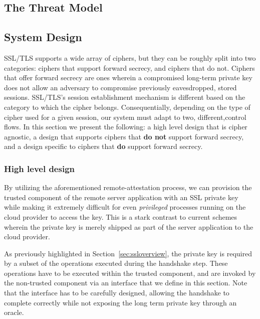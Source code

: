 \documentclass[../main.tex]{subfiles}
\begin{document}
\subsection{The Threat Model}


\subsection{System Design}%
SSL/TLS supports a wide array of ciphers, but they can be roughly
split into two categories: ciphers that support forward secrecy, and
ciphers that do not. Ciphers that offer forward secrecy are ones
wherein a compromised long-term private key does not allow an
adversary to compromise previously eavesdropped, stored
sessions. SSL/TLS's session establishment mechanism is different based
on the category to which the cipher belongs. Consequentially,
depending on the type of cipher used for a given session, our system
must adapt to two, different,control flows. In this section we present
the following: a high level design that is cipher agnostic, a design
that supports ciphers that \textbf{do not} support forward secrecy,
and a design specific to ciphers that \textbf{do} support forward
secrecy.

\subsubsection*{High level design}

By utilizing the aforementioned remote-attestation process, we can
provision the trusted component of the remote server application with
an SSL private key while making it extremely difficult for even
\textit{privileged} processes running on the cloud provider to access
the key. This is a stark contrast to current schemes wherein the
private key is merely shipped as part of the server application to the
cloud provider.

As previously highlighted in Section~\ref{sec:ssloverview}, the
private key is required by a subset of the operations executed during
the handshake step. These operations have to be executed within the
trusted component, and are invoked by the non-trusted component via an
interface that we define in this section. Note that the interface has
to be carefully designed, allowing the handshake to complete correctly
while not exposing the long term private key through an oracle.


\end{document}
